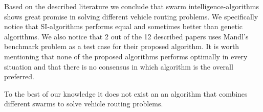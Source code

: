 Based on the described literature we conclude that swarm intelligence-algorithms shows great promise in solving different vehicle routing problems. We specifically notice that SI-algorithms performs equal and sometimes better than genetic algorithms. We also notice that 2 out of the 12 described papers uses Mandl's benchmark problem as a test case for their proposed algorithm. It is worth mentioning that none of the proposed algorithms performs optimally in every situation and that there is no consensus in which algorithm is the overall preferred. 

To the best of our knowledge it does not exist an an algorithm that combines different swarms to solve vehicle routing problems. 

